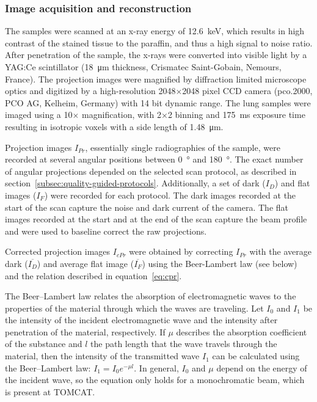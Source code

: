 \subsubsection{Image acquisition and reconstruction}%
\label{seq:Image Acquisition}%
The samples were scanned at an x-ray energy of \SI{12.6}{\kilo\electronvolt}, which results in high contrast of the stained tissue to the paraffin, and thus a high signal to noise ratio. After penetration of the sample, the x-rays were converted into visible light by a YAG:Ce scintillator (\SI{18}{\micro\meter} thickness, Crismatec Saint-Gobain, Nemours, France). The projection images were magnified by diffraction limited microscope optics and digitized by a high-resolution 2048$\times$2048 pixel CCD camera (pco.2000, PCO AG, Kelheim, Germany) with 14 bit dynamic range. The lung samples were imaged using a 10$\times$ magnification, with 2$\times$2 binning and \SI{175}{\milli\second} exposure time resulting in isotropic voxels with a side length of \SI{1.48}{\micro\meter}.

Projection images $I_{Pr}$, essentially single radiographies of the sample, were recorded at several angular positions between \SI{0}{\degree} and \SI{180}{\degree}. The exact number of angular projections depended on the selected scan protocol, as described in section~\ref{subsec:quality-guided-protocols}. Additionally, a set of dark ($I_{D}$) and flat images ($I_{F}$) were recorded for each protocol. The dark images recorded at the start of the scan capture the noise and dark current of the camera. The flat images recorded at the start and at the end of the scan capture the beam profile and were used to baseline correct the raw projections.

Corrected projection images $I_{cPr}$ were obtained by correcting $I_{Pr}$ with the average dark ($\overline{I_{D}}$) and average flat image ($\overline{I_{F}}$) using the Beer-Lambert law (see below) and the relation described in equation~\ref{eq:cpr}.

The Beer--Lambert law relates the absorption of electromagnetic waves to the properties of the material through which the waves are traveling. Let $I_{0}$ and $I_{1}$ be the intensity of the incident electromagnetic wave and the intensity after penetration of the material, respectively. If $\mu$ describes the absorption coefficient of the substance and $l$ the path length that the wave travels through the material, then the intensity of the transmitted wave $I_{1}$ can be calculated using the Beer--Lambert law: \(I_{1}=I_{0}e^{-\mu l}\label{eq:beer-lambert}\). In general, $I_{0}$ and $\mu$ depend on the energy of the incident wave, so the equation only holds for a monochromatic beam, which is present at TOMCAT.

